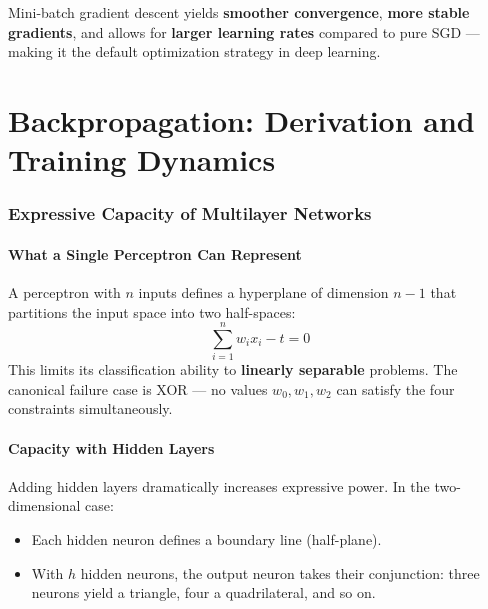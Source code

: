\documentclass[11pt,a4paper]{article}
\theoremstyle{definition}
\theoremstyle{plain}
\theoremstyle{remark}
\begin{document}
\begin{tcolorbox}[colback=green!5!white,colframe=green!75!black]
    Mini-batch gradient descent yields \textbf{smoother convergence}, \textbf{more stable gradients}, and allows for \textbf{larger learning rates} compared to pure SGD --- making it the default optimization strategy in deep learning.
\end{tcolorbox}











\part{Backpropagation: Derivation and Training Dynamics}

\section{Expressive Capacity of Multilayer Networks}

\subsection{What a Single Perceptron Can Represent}

A perceptron with $n$ inputs defines a hyperplane of dimension $n-1$ that partitions the input space into two half-spaces:
\[
    \sum_{i=1}^n w_i x_i - t = 0
\]
This limits its classification ability to \textbf{linearly separable} problems. The canonical failure case is XOR --- no values $w_0, w_1, w_2$ can satisfy the four constraints simultaneously.

\subsection{Capacity with Hidden Layers}

Adding hidden layers dramatically increases expressive power. In the two-dimensional case:

\begin{itemize}
    \item Each hidden neuron defines a boundary line (half-plane).
    \item With $h$ hidden neurons, the output neuron takes their conjunction: three neurons yield a triangle, four a quadrilateral, and so on.
\end{itemize}
\end{document}
